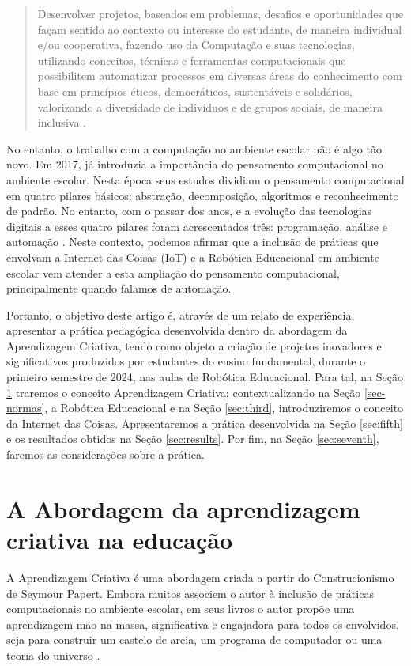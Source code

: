 \documentclass[portuguese]{textolivre}
\begin{document}
\begin{quote}
    Desenvolver projetos, baseados em problemas, desafios e oportunidades que façam sentido ao contexto ou interesse do estudante, de maneira individual e/ou cooperativa, fazendo uso da Computação e suas tecnologias, utilizando conceitos, técnicas e ferramentas computacionais que possibilitem automatizar processos em diversas áreas do conhecimento com base em princípios éticos, democráticos, sustentáveis e solidários, valorizando a diversidade de indivíduos e de grupos sociais, de maneira inclusiva \cite[p. 11]{bncc1}.
\end{quote}

No entanto, o trabalho com a computação no ambiente escolar não é algo tão novo. Em 2017, \textcite {brackmann} já introduzia a importância do pensamento computacional no ambiente escolar. Nesta época seus estudos dividiam o pensamento computacional em quatro pilares básicos: abstração, decomposição, algoritmos e reconhecimento de padrão. No entanto, com o passar dos anos, e a evolução das tecnologias digitais a esses quatro pilares foram acrescentados três: programação, análise e automação \cite {bncc2}. Neste contexto, podemos afirmar que a inclusão de práticas que envolvam a Internet das Coisas (IoT) e a Robótica Educacional em ambiente escolar vem atender a esta ampliação do pensamento computacional, principalmente quando falamos de automação.

Portanto, o objetivo deste artigo é, através de um relato de experiência,  apresentar a prática pedagógica desenvolvida dentro da abordagem da Aprendizagem Criativa, tendo como objeto a criação de projetos inovadores e significativos produzidos por estudantes do ensino fundamental, durante o primeiro semestre de 2024, nas aulas de Robótica Educacional. Para tal, na Seção \ref{sec:fourth} traremos o conceito Aprendizagem Criativa; contextualizando na Seção \ref{sec-normas}, a Robótica Educacional e na Seção \ref{sec:third}, introduziremos o conceito da Internet das Coisas. Apresentaremos a prática desenvolvida na Seção \ref{sec:fifth} e os resultados obtidos na Seção \ref{sec:results}. Por fim, na Seção \ref{sec:seventh}, faremos as considerações sobre a prática.

\section{A Abordagem da aprendizagem criativa na educação}\label{sec:fourth}

A Aprendizagem Criativa é uma abordagem criada a partir do Construcionismo de Seymour Papert. Embora muitos associem o autor à inclusão de práticas computacionais no ambiente escolar, em seus livros o autor propõe  uma aprendizagem mão na massa, significativa e engajadora para todos os envolvidos, seja para construir um castelo de areia, um programa de computador ou uma teoria do universo \cite{papert}.
\end{document}
